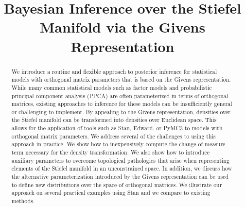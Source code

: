 \documentclass[ba]{imsart}
\numberwithin{equation}{section}
\theoremstyle{plain}
\begin{document}
\begin{frontmatter}
\title{Bayesian Inference over the Stiefel Manifold via the Givens Representation}


\begin{abstract}
We introduce a routine and flexible approach to posterior inference for statistical models with orthogonal matrix parameters that is based on the Givens representation. While many common statistical models such as factor models and probabilistic principal component analysis (PPCA) are often parameterized in terms of orthogonal matrices, existing approaches to inference for these models can be insufficiently general or challenging to implement. By appealing to the Givens representation, densities over the Stiefel manifold can be transformed into densities over Euclidean space. This allows for the application of tools such as Stan, Edward, or PyMC3 to models with orthogonal matrix parameters. We address several of the challenges to using this approach in practice. We show how to inexpensively compute the change-of-measure term necessary for the density transformation. We also show how to introduce auxiliary parameters to overcome topological pathologies that arise when representing elements of the Stiefel manifold in an unconstrained space. In addition, we discuss how the alternative parameterization introduced by the Givens representation can be used to define new distributions over the space of orthogonal matrices. We illustrate our approach on several practical examples using Stan and we compare to existing methods.
\end{abstract}

\begin{keyword}[class=MSC]
\end{keyword}

\begin{keyword}
\kwd{\LaTeXe}
\end{keyword}

\end{frontmatter}
\end{document}

